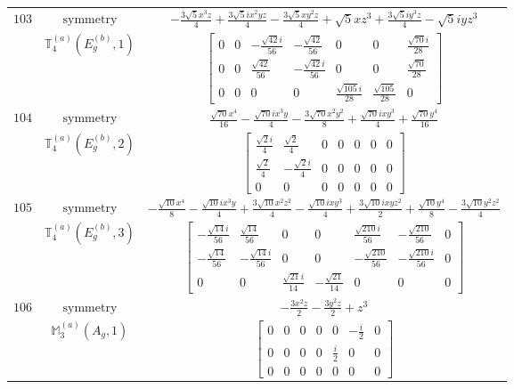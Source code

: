\documentclass[fleqn,8pt,landscape]{jsarticle}
\begin{document}
\begin{longtable}{ccc}
$ 103 $ & $ \text{symmetry} $ & $ - \frac{3 \sqrt{5} x^{3} z}{4} + \frac{3 \sqrt{5} i x^{2} y z}{4} - \frac{3 \sqrt{5} x y^{2} z}{4} + \sqrt{5} x z^{3} + \frac{3 \sqrt{5} i y^{3} z}{4} - \sqrt{5} i y z^{3} $ \\
$  $ & $ \mathbb{T}_{4}^{(a)}(E_{g}^{(b)},1) $ & $ \begin{bmatrix} 0 & 0 & - \frac{\sqrt{42} i}{56} & - \frac{\sqrt{42}}{56} & 0 & 0 & \frac{\sqrt{70} i}{28} \\ 0 & 0 & \frac{\sqrt{42}}{56} & - \frac{\sqrt{42} i}{56} & 0 & 0 & \frac{\sqrt{70}}{28} \\ 0 & 0 & 0 & 0 & \frac{\sqrt{105} i}{28} & \frac{\sqrt{105}}{28} & 0 \end{bmatrix} $ \\ \hline
$ 104 $ & $ \text{symmetry} $ & $ \frac{\sqrt{70} x^{4}}{16} - \frac{\sqrt{70} i x^{3} y}{4} - \frac{3 \sqrt{70} x^{2} y^{2}}{8} + \frac{\sqrt{70} i x y^{3}}{4} + \frac{\sqrt{70} y^{4}}{16} $ \\
$  $ & $ \mathbb{T}_{4}^{(a)}(E_{g}^{(b)},2) $ & $ \begin{bmatrix} \frac{\sqrt{2} i}{4} & \frac{\sqrt{2}}{4} & 0 & 0 & 0 & 0 & 0 \\ \frac{\sqrt{2}}{4} & - \frac{\sqrt{2} i}{4} & 0 & 0 & 0 & 0 & 0 \\ 0 & 0 & 0 & 0 & 0 & 0 & 0 \end{bmatrix} $ \\ \hline
$ 105 $ & $ \text{symmetry} $ & $ - \frac{\sqrt{10} x^{4}}{8} - \frac{\sqrt{10} i x^{3} y}{4} + \frac{3 \sqrt{10} x^{2} z^{2}}{4} - \frac{\sqrt{10} i x y^{3}}{4} + \frac{3 \sqrt{10} i x y z^{2}}{2} + \frac{\sqrt{10} y^{4}}{8} - \frac{3 \sqrt{10} y^{2} z^{2}}{4} $ \\
$  $ & $ \mathbb{T}_{4}^{(a)}(E_{g}^{(b)},3) $ & $ \begin{bmatrix} - \frac{\sqrt{14} i}{56} & \frac{\sqrt{14}}{56} & 0 & 0 & \frac{\sqrt{210} i}{56} & - \frac{\sqrt{210}}{56} & 0 \\ - \frac{\sqrt{14}}{56} & - \frac{\sqrt{14} i}{56} & 0 & 0 & - \frac{\sqrt{210}}{56} & - \frac{\sqrt{210} i}{56} & 0 \\ 0 & 0 & \frac{\sqrt{21} i}{14} & - \frac{\sqrt{21}}{14} & 0 & 0 & 0 \end{bmatrix} $ \\ \hline
$ 106 $ & $ \text{symmetry} $ & $ - \frac{3 x^{2} z}{2} - \frac{3 y^{2} z}{2} + z^{3} $ \\
$  $ & $ \mathbb{M}_{3}^{(a)}(A_{g},1) $ & $ \begin{bmatrix} 0 & 0 & 0 & 0 & 0 & - \frac{i}{2} & 0 \\ 0 & 0 & 0 & 0 & \frac{i}{2} & 0 & 0 \\ 0 & 0 & 0 & 0 & 0 & 0 & 0 \end{bmatrix} $ \\ \hline

\end{longtable}
\end{document}
